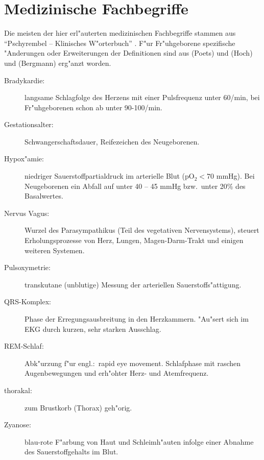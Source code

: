 \chapter{Medizinische Fachbegriffe} 

Die meisten der hier erl"auterten medizinischen Fachbegriffe stammen aus ``Pschyrembel --
Klinisches W"orterbuch'' \cite{Pschyrembel}.  F"ur Fr"uhgeborene spezifische "Anderungen
oder Erweiterungen der Definitionen sind aus \autor(Poets)  \cite{Poets93} und
\autor(Hoch) und \autor(Bergmann) \cite{Hoch96} erg"anzt worden.

\begin{description}
\item[Bradykardie:] langsame Schlagfolge des Herzens mit einer Pulsfrequenz unter 60/min,
  bei Fr"uhgeborenen schon ab unter 90-100/min.
\item[Gestationsalter:] Schwangerschaftsdauer, Reifezeichen des Neugeborenen.
\item[Hypox"amie:] niedriger Sauerstoffpartialdruck im arterielle Blut ($\mathrm{pO_2}<70$
  mmHg). Bei Neugeborenen ein Abfall auf unter 40 -- 45 mmHg bzw.\  unter 20\% des
  Basalwertes. 
\item[Nervus Vagus:] Wurzel des Parasympathikus (Teil des vegetativen Nervensystems), steuert
  Erholungsprozesse von Herz, Lungen, Magen-Darm-Trakt und einigen weiteren Systemen.
\item[Pulsoxymetrie:] transkutane (unblutige) Messung der arteriellen
  Sauerstoffs"attigung.
\item[QRS-Komplex:] Phase der Erregungsausbreitung in den Herzkammern. "Au"sert sich im
  EKG durch kurzen, sehr starken Ausschlag. 
\item[REM-Schlaf:] Abk"urzung f"ur engl.:\  rapid eye movement. Schlafphase mit raschen
  Augenbewegungen und erh"ohter Herz- und Atemfrequenz.
\item[thorakal:] zum Brustkorb (Thorax) geh"orig.
\item[Zyanose:] blau-rote F"arbung von Haut und Schleimh"auten infolge einer Abnahme des
  Sauerstoffgehalts im Blut.
\end{description}

